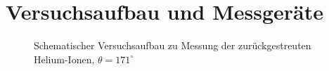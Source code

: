 \section{Versuchsaufbau und Messgeräte}
\begin{figure}[htbp]  
     
  \caption{Schematischer Versuchsaufbau zu Messung der zurückgestreuten Helium-Ionen, $\theta=171^\circ$}
  \label{aufbau}
\end{figure}
